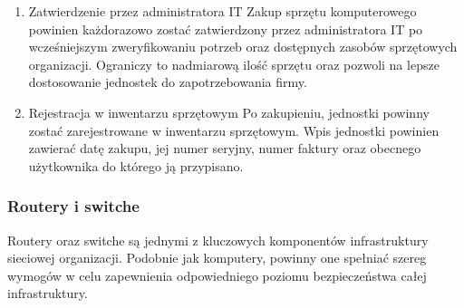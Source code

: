 \documentclass[12pt,a4paper]{article}
\begin{document}
\begin{enumerate}
    \item Zatwierdzenie przez administratora IT Zakup sprzętu komputerowego powinien każdorazowo zostać zatwierdzony przez administratora IT po wcześniejszym zweryfikowaniu potrzeb oraz dostępnych zasobów sprzętowych organizacji. Ograniczy to nadmiarową ilość sprzętu oraz pozwoli na lepsze dostosowanie jednostek do zapotrzebowania firmy.
    
    \item Rejestracja w inwentarzu sprzętowym Po zakupieniu, jednostki powinny zostać zarejestrowane w inwentarzu sprzętowym. Wpis jednostki powinien zawierać datę zakupu, jej numer seryjny, numer faktury oraz obecnego użytkownika do którego ją przypisano.
\end{enumerate}

\subsubsection{Routery i switche}\label{routery-i-switche}
Routery oraz switche są jednymi z kluczowych komponentów infrastruktury sieciowej organizacji. Podobnie jak komputery, powinny one spełniać szereg wymogów w celu zapewnienia odpowiedniego poziomu bezpieczeństwa całej infrastruktury.
\end{document}
